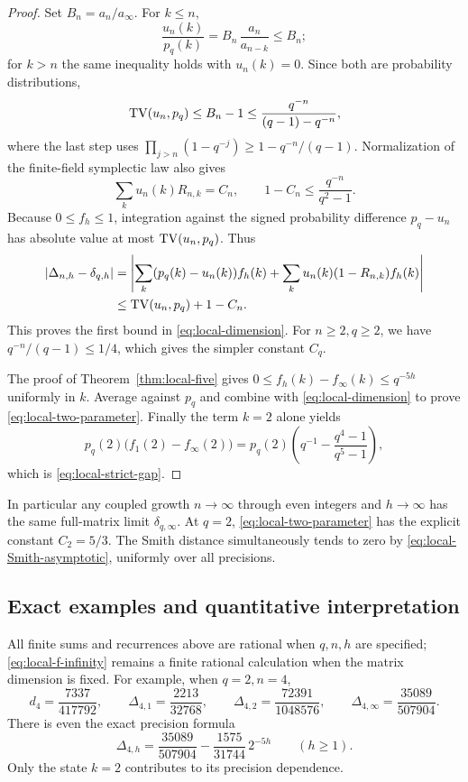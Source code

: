 \begin{proof}
Set \(B_n=a_n/a_\infty\). For \(k\le n\),
\[
 \frac{u_n(k)}{p_q(k)}
       =B_n\,\frac{a_n}{a_{n-k}}\le B_n;
\]
for \(k>n\) the same inequality holds with \(u_n(k)=0\).
Since both are probability distributions,
\[
 \operatorname{TV}(u_n,p_q)\le B_n-1
   \le\frac{q^{-n}}{(q-1)-q^{-n}},
\]
where the last step uses
\(\prod_{j>n}(1-q^{-j})\ge1-q^{-n}/(q-1)\).
Normalization of the finite-field symplectic law also gives
\[
 \sum_k u_n(k)R_{n,k}=C_n,\qquad
 1-C_n\le\frac{q^{-n}}{q^2-1}.
\]
Because \(0\le f_h\le1\), integration against the signed
probability difference \(p_q-u_n\) has absolute value at most
\(\operatorname{TV}(u_n,p_q)\). Thus
\begin{align*}
 |\Delta_{n,h}-\delta_{q,h}|
 &=
 \left|\sum_k(p_q(k)-u_n(k))f_h(k)
       +\sum_k u_n(k)(1-R_{n,k})f_h(k)\right|\\
 &\le\operatorname{TV}(u_n,p_q)+1-C_n.
\end{align*}
This proves the first bound in \eqref{eq:local-dimension}.
For \(n\ge2,q\ge2\), we have \(q^{-n}/(q-1)\le1/4\),
which gives the simpler constant \(C_q\).

The proof of Theorem~\ref{thm:local-five} gives
\(0\le f_h(k)-f_\infty(k)\le q^{-5h}\) uniformly in \(k\).
Average against \(p_q\) and combine with
\eqref{eq:local-dimension} to prove \eqref{eq:local-two-parameter}.
Finally the term \(k=2\) alone yields
\[
 p_q(2)\bigl(f_1(2)-f_\infty(2)\bigr)
 =p_q(2)\left(q^{-1}-\frac{q^4-1}{q^5-1}\right),
\]
which is \eqref{eq:local-strict-gap}.
\end{proof}

In particular any coupled growth \(n\to\infty\) through even integers
and \(h\to\infty\) has the same full-matrix limit
\(\delta_{q,\infty}\). At \(q=2\), \eqref{eq:local-two-parameter}
has the explicit constant \(C_2=5/3\).
The Smith distance simultaneously tends to zero by
\eqref{eq:local-Smith-asymptotic}, uniformly over all precisions.

\subsection{Exact examples and quantitative interpretation}

All finite sums and recurrences above are rational when \(q,n,h\)
are specified; \eqref{eq:local-f-infinity} remains a finite rational
calculation when the matrix dimension is fixed.
For example, when \(q=2,n=4\),
\[
 d_4=\frac{7337}{417792},\qquad
 \Delta_{4,1}=\frac{2213}{32768},\qquad
 \Delta_{4,2}=\frac{72391}{1048576},\qquad
 \Delta_{4,\infty}=\frac{35089}{507904}.
\]
There is even the exact precision formula
\[
 \Delta_{4,h}
   =\frac{35089}{507904}
       -\frac{1575}{31744}\,2^{-5h}
       \qquad(h\ge1).
 \tag{L30}\label{eq:local-binary-four}
\]
Only the state \(k=2\) contributes to its precision dependence.

